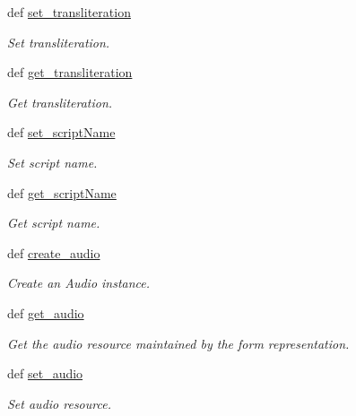 \begin{DoxyCompactItemize}
def \hyperlink{classlmf_1_1src_1_1core_1_1form__representation_1_1_form_representation_af7579c20430dae05be250087a8f86e58}{set\+\_\+transliteration}
\begin{DoxyCompactList}\small\item\em Set transliteration. \end{DoxyCompactList}\item 
def \hyperlink{classlmf_1_1src_1_1core_1_1form__representation_1_1_form_representation_af4ac72df2feb583dafda9b1c07359162}{get\+\_\+transliteration}
\begin{DoxyCompactList}\small\item\em Get transliteration. \end{DoxyCompactList}\item 
def \hyperlink{classlmf_1_1src_1_1core_1_1form__representation_1_1_form_representation_ae3e8092f467c8971142c38888765e6c3}{set\+\_\+script\+Name}
\begin{DoxyCompactList}\small\item\em Set script name. \end{DoxyCompactList}\item 
def \hyperlink{classlmf_1_1src_1_1core_1_1form__representation_1_1_form_representation_a19be12afb3fb0678bb3c0aa9a9831d55}{get\+\_\+script\+Name}
\begin{DoxyCompactList}\small\item\em Get script name. \end{DoxyCompactList}\item 
def \hyperlink{classlmf_1_1src_1_1core_1_1form__representation_1_1_form_representation_a04355acdc07632675f6e31b2bb17abb6}{create\+\_\+audio}
\begin{DoxyCompactList}\small\item\em Create an Audio instance. \end{DoxyCompactList}\item 
def \hyperlink{classlmf_1_1src_1_1core_1_1form__representation_1_1_form_representation_a4ed905b8b9b6c9bb747434c05da90e9c}{get\+\_\+audio}
\begin{DoxyCompactList}\small\item\em Get the audio resource maintained by the form representation. \end{DoxyCompactList}\item 
def \hyperlink{classlmf_1_1src_1_1core_1_1form__representation_1_1_form_representation_afb51c18e49b5452233e38d3aa12e5389}{set\+\_\+audio}
\begin{DoxyCompactList}\small\item\em Set audio resource. \end{DoxyCompactList}\end{DoxyCompactItemize}
